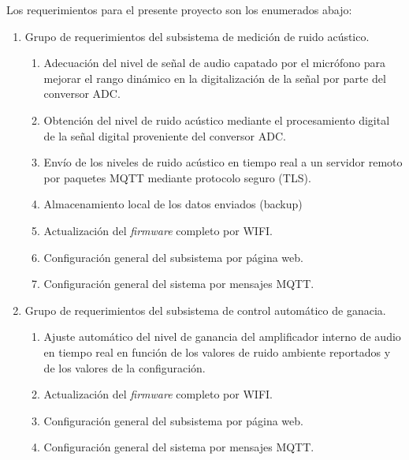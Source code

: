 \documentclass[11pt]{charter}
\begin{document}
Los requerimientos para el presente proyecto son los enumerados abajo:
\begin{enumerate}
\item Grupo de requerimientos del subsistema de medición de ruido acústico.
  \begin{enumerate}
  \item Adecuación del nivel de señal de audio capatado por el micrófono para mejorar el rango dinámico en la digitalización de la señal por parte del conversor ADC.
  \item Obtención del nivel de ruido acústico  mediante el procesamiento digital de la señal digital proveniente del conversor ADC.
  \item Envío de los niveles de ruido acústico en tiempo real a un servidor remoto por paquetes MQTT mediante protocolo seguro (TLS).
  \item Almacenamiento local de los datos enviados (backup)
  \item Actualización del {\em firmware\/} completo por WIFI.  \item Configuración general del subsistema por página web.
  \item Configuración general del sistema por mensajes MQTT.
  \end{enumerate}
  
\item Grupo de requerimientos del subsistema de
control automático de ganacia.
  \begin{enumerate}
  \item Ajuste automático del nivel de ganancia del amplificador interno de audio en tiempo real en función de los valores de ruido ambiente reportados y de los valores de la configuración.
  \item Actualización del {\em firmware\/} completo por WIFI.
  \item Configuración general del subsistema por página web.
  \item Configuración general del sistema por mensajes MQTT.
  \end{enumerate}
  

\end{enumerate}
\end{document}

